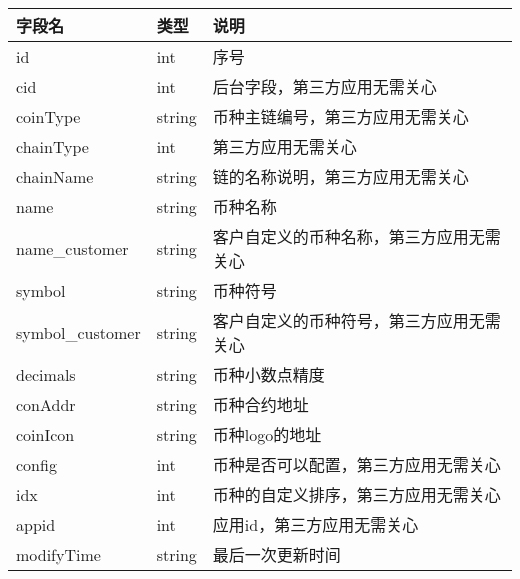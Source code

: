 \documentclass[letterpaper,10pt,english]{sphinxmanual}
\begin{document}


\begin{savenotes}\sphinxattablestart
\centering
\begin{tabulary}{\linewidth}[t]{|T|T|T|}
\hline
\sphinxstyletheadfamily 
字段名
&\sphinxstyletheadfamily 
类型
&\sphinxstyletheadfamily 
说明
\\
\hline
id
&
int
&
序号
\\
\hline
cid
&
int
&
后台字段，第三方应用无需关心
\\
\hline
coinType
&
string
&
币种主链编号，第三方应用无需关心
\\
\hline
chainType
&
int
&
第三方应用无需关心
\\
\hline
chainName
&
string
&
链的名称说明，第三方应用无需关心
\\
\hline
name
&
string
&
币种名称
\\
\hline
name\_customer
&
string
&
客户自定义的币种名称，第三方应用无需关心
\\
\hline
symbol
&
string
&
币种符号
\\
\hline
symbol\_customer
&
string
&
客户自定义的币种符号，第三方应用无需关心
\\
\hline
decimals
&
string
&
币种小数点精度
\\
\hline
conAddr
&
string
&
币种合约地址
\\
\hline
coinIcon
&
string
&
币种logo的地址
\\
\hline
config
&
int
&
币种是否可以配置，第三方应用无需关心
\\
\hline
idx
&
int
&
币种的自定义排序，第三方应用无需关心
\\
\hline
appid
&
int
&
应用id，第三方应用无需关心
\\
\hline
modifyTime
&
string
&
最后一次更新时间
\\
\hline
\end{tabulary}
\par
\sphinxattableend\end{savenotes}


\begin{sphinxVerbatim}[commandchars=\\\{\}]
     
\end{sphinxVerbatim}
\end{document}
